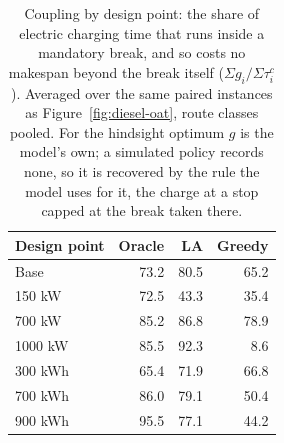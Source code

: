 \begin{table}[ht]\centering
\caption{Coupling by design point: the share of electric charging time that runs inside a mandatory break, and so costs no makespan beyond the break itself ($\Sigma g_i / \Sigma \tau^c_i$).  Averaged over the same paired instances as Figure~\ref{fig:diesel-oat}, route classes pooled.  For the hindsight optimum $g$ is the model's own; a simulated policy records none, so it is recovered by the rule the model uses for it, the charge at a stop capped at the break taken there.}
\label{tab:diesel-oat-coupling}
\begin{tabular}{lrrr}
\hline
Design point & Oracle & LA & Greedy \\
\hline
Base & 73.2 & 80.5 & 65.2 \\
150 kW & 72.5 & 43.3 & 35.4 \\
700 kW & 85.2 & 86.8 & 78.9 \\
1000 kW & 85.5 & 92.3 & 8.6 \\
300 kWh & 65.4 & 71.9 & 66.8 \\
700 kWh & 86.0 & 79.1 & 50.4 \\
900 kWh & 95.5 & 77.1 & 44.2 \\
\hline
\end{tabular}
\end{table}
